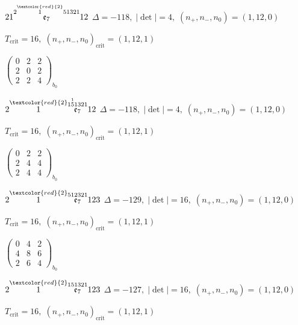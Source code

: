 \documentclass[10pt]{article}
\begin{document}
$21\overset{2\overset{\textcolor{red}{2}}{1}51321}{\mathfrak{e}_7}12$ \quad $\Delta=-118,\; |\det|=4,\; (n_+,n_-,n_0)=(1,12,0)$

\hspace{1em}$T_{\text{crit}}=16,\; (n_+,n_-,n_0)_{\text{crit}}=(1,12,1)$

\hspace{2em}$\left(\begin{smallmatrix}0 & 2 & 2 \\ 2 & 0 & 2 \\ 2 & 2 & 4\end{smallmatrix}\right)_{\!b_0}$

\smallskip

$2\overset{\textcolor{red}{2}}{1}\overset{1\overset{1}{5}1321}{\mathfrak{e}_7}12$ \quad $\Delta=-118,\; |\det|=4,\; (n_+,n_-,n_0)=(1,12,0)$

\hspace{1em}$T_{\text{crit}}=16,\; (n_+,n_-,n_0)_{\text{crit}}=(1,12,1)$

\hspace{2em}$\left(\begin{smallmatrix}0 & 2 & 2 \\ 2 & 4 & 4 \\ 2 & 4 & 4\end{smallmatrix}\right)_{\!b_0}$

\smallskip

$2\overset{\textcolor{red}{2}}{1}\overset{512321}{\mathfrak{e}_7}123$ \quad $\Delta=-129,\; |\det|=16,\; (n_+,n_-,n_0)=(1,12,0)$

\hspace{1em}$T_{\text{crit}}=16,\; (n_+,n_-,n_0)_{\text{crit}}=(1,12,1)$

\hspace{2em}$\left(\begin{smallmatrix}0 & 4 & 2 \\ 4 & 8 & 6 \\ 2 & 6 & 4\end{smallmatrix}\right)_{\!b_0}$

\smallskip

$2\overset{\textcolor{red}{2}}{1}\overset{151321}{\mathfrak{e}_7}123$ \quad $\Delta=-127,\; |\det|=16,\; (n_+,n_-,n_0)=(1,12,0)$

\hspace{1em}$T_{\text{crit}}=16,\; (n_+,n_-,n_0)_{\text{crit}}=(1,12,1)$
\end{document}
